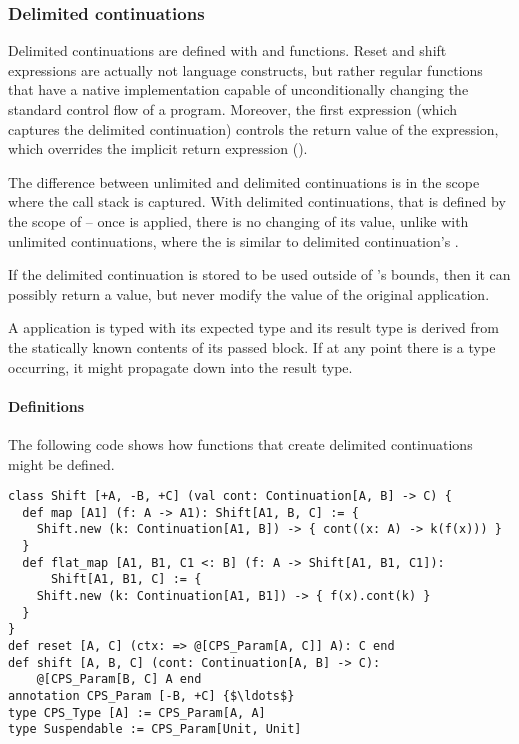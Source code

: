 \subsubsection{Delimited continuations}

Delimited continuations are defined with  and  functions. Reset and shift expressions are actually not language constructs, but rather regular functions that have a native implementation capable of unconditionally changing the standard control flow of a program. Moreover, the first  expression (which captures the delimited continuation) controls the return value of the  expression, which overrides the implicit return expression ().

The difference between unlimited and delimited continuations is in the scope where the call stack is captured. With delimited continuations, that is defined by the scope of  -- once  is applied, there is no changing of its value, unlike with unlimited continuations, where the  is similar to delimited continuation's . 

If the delimited continuation is stored to be used outside of 's bounds, then it can possibly return a value, but never modify the value of the original  application.

A  application is typed with its expected type and its result type is derived from the statically known contents of its passed block. If at any point there is a  type occurring, it might propagate down into the result type. 

\paragraph{Definitions}
The following code shows how functions that create delimited continuations might be defined. 
\begin{lstlisting}
class Shift [+A, -B, +C] (val cont: Continuation[A, B] -> C) {
  def map [A1] (f: A -> A1): Shift[A1, B, C] := {
    Shift.new (k: Continuation[A1, B]) -> { cont((x: A) -> k(f(x))) }
  }
  def flat_map [A1, B1, C1 <: B] (f: A -> Shift[A1, B1, C1]): 
      Shift[A1, B1, C] := {
    Shift.new (k: Continuation[A1, B1]) -> { f(x).cont(k) }
  }
}
def reset [A, C] (ctx: => @[CPS_Param[A, C]] A): C end
def shift [A, B, C] (cont: Continuation[A, B] -> C): 
    @[CPS_Param[B, C] A end
annotation CPS_Param [-B, +C] {$\ldots$}
type CPS_Type [A] := CPS_Param[A, A]
type Suspendable := CPS_Param[Unit, Unit]
\end{lstlisting}

